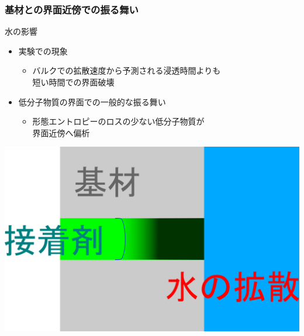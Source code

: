 \documentclass[12pt, dvipdfmx]{beamer}
\begin{document}
\begin{frame}
	\frametitle{基材との界面近傍での振る舞い}
        \begin{block}{水の影響}
            \begin{itemize}
                \item 実験での現象
                \begin{itemize}
                    \item バルクでの拡散速度から予測される浸透時間よりも\\短い時間での界面破壊
                \end{itemize}
                \item 低分子物質の界面での一般的な振る舞い
                \begin{itemize}
                    \item 形態エントロピーのロスの少ない低分子物質が\\界面近傍へ偏析
                \end{itemize}
            \end{itemize}
        \end{block}
        
				\begin{center}
					\includegraphics[width=.5\textwidth]{adherent_water_2.png}
				\end{center}
\end{frame}
\end{document}
